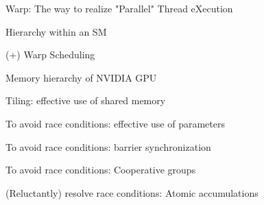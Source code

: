 \documentclass[dvipdfmx,11pt]{beamer}   %
\begin{document}
\begin{frame}{Warp: The way to realize "Parallel" Thread eXecution}
\end{frame}
\begin{frame}{Hierarchy within an SM}

\end{frame}
\begin{frame}{(+) Warp Scheduling}

\end{frame}
\begin{frame}{Memory hierarchy of NVIDIA GPU}

\end{frame}
\begin{frame}{Tiling: effective use of shared memory}

\end{frame}
\begin{frame}{To avoid race conditions: effective use of parameters}

\end{frame}
\begin{frame}{To avoid race conditions: barrier synchronization}

\end{frame}
\begin{frame}{To avoid race conditions: Cooperative groups}

\end{frame}
\begin{frame}{(Reluctantly) resolve race conditions: Atomic accumulations}

\end{frame}
\end{document}
